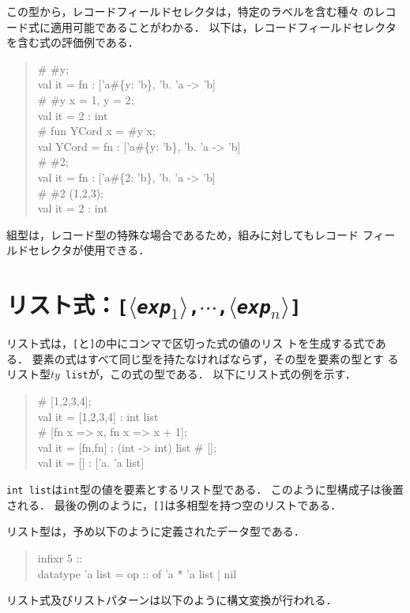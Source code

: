 \documentclass{jbook}
\newcommand{\code}[1]{\mbox{\large\tt #1}}
\newcommand{\nonterm}[1]{\mbox{$\langle$}{\it #1}\mbox{$\rangle$}}
\newcommand{\term}[1]{\mbox{{\tt #1}}}
\newenvironment{program}{\begin{quote}\begin{tt}}%
                        {\end{tt}\end{quote}}
\begin{document}
	この型から，レコードフィールドセレクタは，特定のラベルを含む種々
のレコード式に適用可能であることがわかる．
	以下は，レコードフィールドセレクタを含む式の評価例である．
\begin{program}
\# \#y;
\\
val it = fn : ['a\#\{y: 'b\}, 'b. 'a -> 'b]
\\
\# \#y {x = 1, y = 2};
\\
val it = 2 : int
\\
\# fun YCord x = \#y x;
\\
val YCord = fn : ['a\#\{y: 'b\}, 'b. 'a -> 'b]
\\
\# \#2;
\\
val it = fn : ['a\#\{2: 'b\}, 'b. 'a -> 'b]
\\
\# \#2 (1,2,3);
\\
val it = 2 : int
\end{program}
	組型は，レコード型の特殊な場合であるため，組みに対してもレコード
フィールドセレクタが使用できる．

\section{リスト式：\term{[\nonterm{exp$_1$},$\cdots$,\nonterm{exp$_n$}]}}

	リスト式は，\code{[}と\code{]}の中にコンマで区切った式の値のリス
トを生成する式である．
	要素の式はすべて同じ型を持たなければならず，その型を要素の型とす
るリスト型\code{$ty$ list}が，この式の型である．
	以下にリスト式の例を示す．

\begin{program}
\# [1,2,3,4];
\\
val it = [1,2,3,4] : int list
\\
\# [fn x => x, fn x => x + 1];
\\
val it = [fn,fn] : (int -> int) list
\# [];
\\
val it = [] : ['a. 'a list]
\end{program}

	\code{int list}は\code{int}型の値を要素とするリスト型である．
	このように型構成子は後置される．
	最後の例のように，\code{[]}は多相型を持つ空のリストである．

	リスト型は，予め以下のように定義されたデータ型である．
\begin{program}
infixr 5 ::\\
datatype 'a list = op :: of 'a * 'a list | nil
\end{program}
	リスト式及びリストパターンは以下のように構文変換が行われる．
\end{document}
